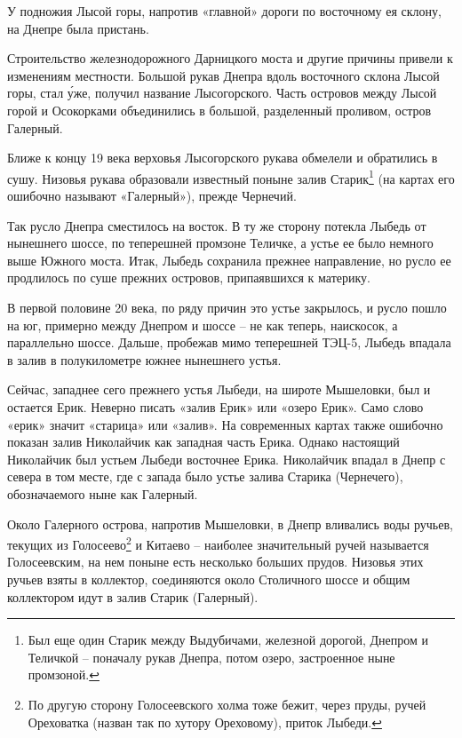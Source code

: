 У подножия Лысой горы, напротив «главной» дороги по восточному ея склону, на Днепре была пристань.

Строительство железнодорожного Дарницкого моста и другие причины привели к изменениям местности. Большой рукав Днепра вдоль восточного склона Лысой горы, стал \'уже, получил название Лысогорского. Часть островов между Лысой горой и Осокорками объединились в большой, разделенный проливом, остров Галерный.

Ближе к концу 19 века верховья Лысогорского рукава обмелели и обратились в сушу. Низовья рукава образовали известный поныне залив Старик\footnote{Был еще один Старик между Выдубичами, железной дорогой, Днепром и Теличкой – поначалу рукав Днепра, потом озеро, застроенное ныне промзоной.} (на картах его ошибочно называют «Галерный»), прежде Чернечий. 

Так русло Днепра сместилось на восток. В ту же сторону потекла Лыбедь от нынешнего шоссе, по теперешней промзоне Теличке, а устье ее было немного выше Южного моста. Итак, Лыбедь сохранила прежнее направление, но русло ее продлилось по суше прежних островов, припаявшихся к материку.


В первой половине 20 века, по ряду причин это устье закрылось, и русло пошло на юг, примерно между Днепром и шоссе – не как теперь, наискосок, а параллельно шоссе. Дальше, пробежав мимо теперешней ТЭЦ-5, Лыбедь впадала в залив в полукилометре южнее нынешнего устья.

Сейчас, западнее сего прежнего устья Лыбеди, на широте Мышеловки, был и остается Ерик. Неверно писать «залив Ерик» или «озеро Ерик». Само слово «ерик» значит «старица» или «залив». На современных картах также ошибочно показан залив Николайчик как западная часть Ерика. Однако настоящий Николайчик был устьем Лыбеди восточнее Ерика. Николайчик впадал в Днепр с севера в том месте, где с запада было устье залива Старика (Чернечего), обозначаемого ныне как Галерный.

Около Галерного острова, напротив Мышеловки, в Днепр вливались воды ручьев, текущих из Голосеево\footnote{По другую сторону Голосеевского холма тоже бежит, через пруды, ручей Ореховатка (назван так по хутору Ореховому), приток Лыбеди.} и Китаево – наиболее значительный ручей называется Голосеевским, на нем поныне есть несколько больших прудов. Низовья этих ручьев взяты в коллектор, соединяются около Столичного шоссе и общим коллектором идут в залив Старик (Галерный).


